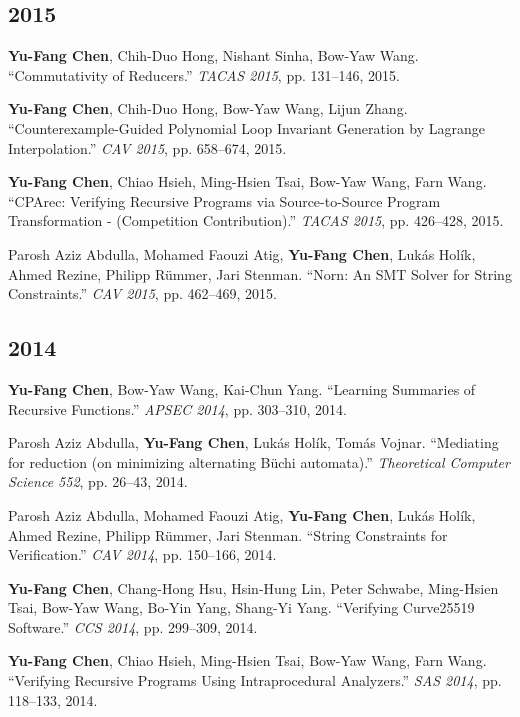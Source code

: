 \documentclass[10.5pt]{article}
\begin{document}
\subsection*{2015}
\begin{enumerate}[leftmargin=*,label={[\arabic*]},resume]
\item \textbf{Yu-Fang Chen}, Chih-Duo Hong, Nishant Sinha, Bow-Yaw Wang. ``Commutativity of Reducers.'' \emph{TACAS 2015}, pp. 131--146, 2015.
\item \textbf{Yu-Fang Chen}, Chih-Duo Hong, Bow-Yaw Wang, Lijun Zhang. ``Counterexample-Guided Polynomial Loop Invariant Generation by Lagrange Interpolation.'' \emph{CAV 2015}, pp. 658--674, 2015.
\item \textbf{Yu-Fang Chen}, Chiao Hsieh, Ming-Hsien Tsai, Bow-Yaw Wang, Farn Wang. ``CPArec: Verifying Recursive Programs via Source-to-Source Program Transformation - (Competition Contribution).'' \emph{TACAS 2015}, pp. 426--428, 2015.
\item Parosh Aziz Abdulla, Mohamed Faouzi Atig, \textbf{Yu-Fang Chen}, Lukás Holík, Ahmed Rezine, Philipp Rümmer, Jari Stenman. ``Norn: An SMT Solver for String Constraints.'' \emph{CAV 2015}, pp. 462--469, 2015.
\end{enumerate}
\subsection*{2014}
\begin{enumerate}[leftmargin=*,label={[\arabic*]},resume]
\item \textbf{Yu-Fang Chen}, Bow-Yaw Wang, Kai-Chun Yang. ``Learning Summaries of Recursive Functions.'' \emph{APSEC 2014}, pp. 303--310, 2014.
\item Parosh Aziz Abdulla, \textbf{Yu-Fang Chen}, Lukás Holík, Tomás Vojnar. ``Mediating for reduction (on minimizing alternating Büchi automata).'' \emph{Theoretical Computer Science 552}, pp. 26--43, 2014.
\item Parosh Aziz Abdulla, Mohamed Faouzi Atig, \textbf{Yu-Fang Chen}, Lukás Holík, Ahmed Rezine, Philipp Rümmer, Jari Stenman. ``String Constraints for Verification.'' \emph{CAV 2014}, pp. 150--166, 2014.
\item \textbf{Yu-Fang Chen}, Chang-Hong Hsu, Hsin-Hung Lin, Peter Schwabe, Ming-Hsien Tsai, Bow-Yaw Wang, Bo-Yin Yang, Shang-Yi Yang. ``Verifying Curve25519 Software.'' \emph{CCS 2014}, pp. 299--309, 2014.
\item \textbf{Yu-Fang Chen}, Chiao Hsieh, Ming-Hsien Tsai, Bow-Yaw Wang, Farn Wang. ``Verifying Recursive Programs Using Intraprocedural Analyzers.'' \emph{SAS 2014}, pp. 118--133, 2014.
\end{enumerate}
\end{document}
